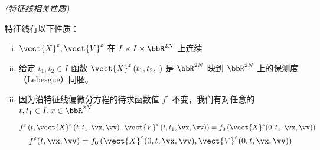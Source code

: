 \begin{lemma}\textit{(特征线相关性质)}

特征线有以下性质：
\begin{enumerate}[(i)]
    \item $\vect{X}^{\varepsilon},\vect{V}^{\varepsilon}$ 在 $I \times I \times \bbR^{2N}$ 上连续
    \item 给定 $t_{1}, t_{2} \in I$ 函数 $\vect{X}^{\varepsilon}\left(t_{1}, t_{2}, \cdot\right)$ 是 $\bbR^{2N}$ 映到 $\bbR^{2N}$ 上的保测度（Lebesgue）同胚。


    \item 因为沿特征线偏微分方程的待求函数值 $f^{\varepsilon}$ 不变，我们有对任意的 $t, t_{1} \in I, x \in \bbR^{2N}$
    
    $$f^{\varepsilon}\left(t, \vect{X}^{\varepsilon}\left(t, t_{1}, \vx, \vv\right), \vect{V}^{\varepsilon}\left(t, t_{1}, \vx, \vv\right)\right)=f_0\left(\vect{X}^{\varepsilon}(0, t_1, \vx, \vv)\right)$$
    \begin{equation}
        \label{eq:characteristic-traceback}
    f^{\varepsilon}(t, \vx, \vv)=f_{0}\left(\vect{X}^{\varepsilon}(0, t, \vx, \vv), \vect{V}^{\varepsilon}(0, t, \vx, \vv)\right)
    \end{equation}


\end{enumerate}
\end{lemma}
